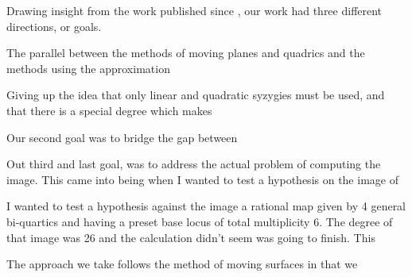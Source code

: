 \documentclass[fleqn,reqno]{amsart}
\begin{document}
\newpage
Drawing insight from the work published since \citet{CGZ-00},
our work had three different directions, or goals.

The parallel between the methods of moving planes and quadrics and the methods using
the approximation

Giving up the idea that only linear and quadratic syzygies must be used, and that there is
a special degree which makes

Our second goal was to bridge the gap between 

Out third and last goal, was to address the actual problem of computing the image.
This came into being when I wanted to test a hypothesis on the image of

I wanted to test a hypothesis against the image a rational map
given by 4 general bi-quartics and having a preset base locus of total multiplicity $6$.
The degree of that image was 26 and the calculation didn't seem was going to finish.
This 

\newpage

The approach we take follows the method of moving surfaces in that we 



\end{document}
